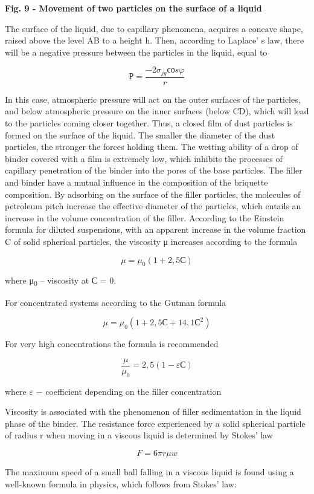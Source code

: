 {\bfseries Fig. 9 - Movement of two particles on the surface of a liquid}

The surface of the liquid, due to capillary phenomena, acquires a
concave shape, raised above the level AB to a height h. Then, according
to Laplace' s law, there will be a negative pressure
between the particles in the liquid, equal to

\[Р = \frac{- 2\sigma_{jg}соs\varphi}{r}\]

In this case, atmospheric pressure will act on the outer surfaces of the
particles, and below atmospheric pressure on the inner surfaces (below
CD), which will lead to the particles coming closer together. Thus, a
closed film of dust particles is formed on the surface of the liquid.
The smaller the diameter of the dust particles, the stronger the forces
holding them. The wetting ability of a drop of binder covered with a
film is extremely low, which inhibits the processes of capillary
penetration of the binder into the pores of the base particles. The
filler and binder have a mutual influence in the composition of the
briquette composition. By adsorbing on the surface of the filler
particles, the molecules of petroleum pitch increase the effective
diameter of the particles, which entails an increase in the volume
concentration of the filler. According to the Einstein formula for
diluted suspensions, with an apparent increase in the volume fraction C
of solid spherical particles, the viscosity μ increases according to the
formula

\[\mu = \mu_{0}(1 + 2,5С)\]

where μ\textsubscript{0} -- viscosity at С = 0.

For concentrated systems according to the Gutman formula

\[\mu = \mu_{0}(1 + 2,5С + {14,1С}^{2})\]

For very high concentrations the formula is recommended

\[\frac{\mu}{\mu_{0}} = 2,5(1 - \varepsilon С)\]

where \(\varepsilon\) − coefficient depending on the filler
concentration

Viscosity is associated with the phenomenon of filler sedimentation in
the liquid phase of the binder. The resistance force experienced by a
solid spherical particle of radius r when moving in a viscous liquid is
determined by Stokes'{} law

\[F = 6\pi r\mu w\]

The maximum speed of a small ball falling in a viscous liquid is found
using a well-known formula in physics, which follows from
Stokes'{} law:

